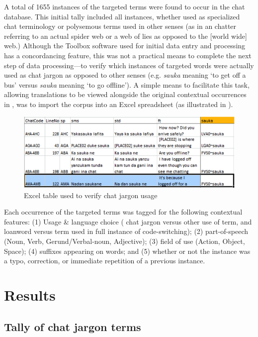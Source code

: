 \documentclass[output=paper
,newtxmath
,modfonts
,nonflat]{langsci/langscibook}
\begin{document}
A total of 1655 instances of the targeted terms were found to occur in the  chat database. This initial tally included all instances, whether used as specialized chat terminology or polysemous terms used in other senses (as in an  chatter referring to an actual spider web or a web of lies as opposed to the [world wide] web.) Although the Toolbox software used for initial data entry and processing has a concordancing feature, this was not a practical means to complete the next step of data processing—to verify which instances of targeted words were actually used as chat jargon as opposed to other senses (e.g. \textit{sauka} meaning ‘to get off a bus’ versus \textit{sauka} meaning ‘to go offline’). A simple means to facilitate this task, allowing  translations to be viewed alongside the original contextual occurrences in , was to import the corpus into an Excel spreadsheet (as illustrated in ).

  

\begin{figure}
\includegraphics[width=\textwidth]{figures/purvis-fig2.png}
\caption{Excel table used to verify chat jargon usage}
\label{fig:purvis:2}
\end{figure} 

Each occurrence of the targeted terms was tagged for the following contextual features: (1) Usage \& language choice ( chat jargon versus other use of  term, and  loanword versus  term used in full instance of code-switching); (2) part-of-speech (Noun, Verb, Gerund/Verbal-noun, Adjective); (3) field of use (Action, Object, Space); (4)  suffixes appearing on words; and (5) whether or not the instance was a typo, correction, or immediate repetition of a previous instance. 

\section{Results}\label{sec:purvis:4}
\subsection{Tally of chat jargon terms}
\end{document}
